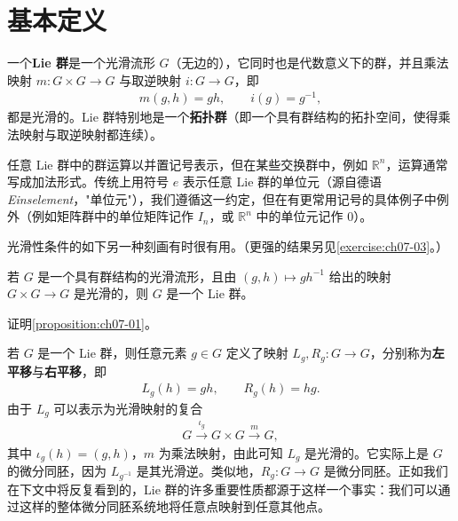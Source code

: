 \documentclass[../../main.tex]{subfiles}
\begin{document}
\section{基本定义}\label{section:ch07-基本定义}

一个\textbf{Lie 群}是一个光滑流形 $G$（无边的），它同时也是代数意义下的群，并且乘法映射 $m\colon G\times G\to G$ 与取逆映射 $i\colon G\to G$，即
\begin{align*}
m(g,h)=gh,\qquad i(g)=g^{-1},
\end{align*}
都是光滑的。Lie 群特别地是一个\textbf{拓扑群}（即一个具有群结构的拓扑空间，使得乘法映射与取逆映射都连续）。

任意 Lie 群中的群运算以并置记号表示，但在某些交换群中，例如 $\mathbb{R}^n$，运算通常写成加法形式。传统上用符号 $e$ 表示任意 Lie 群的单位元（源自德语 \emph{Einselement}，"单位元"），我们遵循这一约定，但在有更常用记号的具体例子中例外（例如矩阵群中的单位矩阵记作 $I_n$，或 $\mathbb{R}^n$ 中的单位元记作 $0$）。

光滑性条件的如下另一种刻画有时很有用。（更强的结果另见\cref{exercise:ch07-03}。）

\begin{proposition}\label{proposition:ch07-01}
若 $G$ 是一个具有群结构的光滑流形，且由 $(g,h)\mapsto gh^{-1}$ 给出的映射 $G\times G\to G$ 是光滑的，则 $G$ 是一个 Lie 群。
\end{proposition}

\begin{exercise}\label{exercise:ch07-02}
证明\cref{proposition:ch07-01}。
\end{exercise}

若 $G$ 是一个 Lie 群，则任意元素 $g\in G$ 定义了映射 $L_g,R_g\colon G\to G$，分别称为\textbf{左平移}与\textbf{右平移}，即
\begin{align*}
L_g(h)=gh,\qquad R_g(h)=hg.
\end{align*}
由于 $L_g$ 可以表示为光滑映射的复合
\begin{align*}
G\xrightarrow{\iota_g}G\times G\xrightarrow{m}G,
\end{align*}
其中 $\iota_g(h)=(g,h)$，$m$ 为乘法映射，由此可知 $L_g$ 是光滑的。它实际上是 $G$ 的微分同胚，因为 $L_{g^{-1}}$ 是其光滑逆。类似地，$R_g\colon G\to G$ 是微分同胚。正如我们在下文中将反复看到的，Lie 群的许多重要性质都源于这样一个事实：我们可以通过这样的整体微分同胚系统地将任意点映射到任意其他点。
\end{document}
